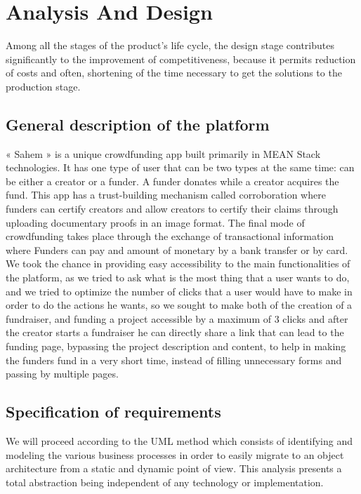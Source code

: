 

\setcounter{mtc}{10}
\chapter{Analysis And Design}%
\label{chap:chapter_two}
\minitoc
Among all the stages of the product's life cycle, the design stage contributes significantly to the improvement of competitiveness, because it permits reduction of costs and often, shortening of the time necessary to get the solutions to the production stage.

\section{General description of the platform}
« Sahem » is a unique crowdfunding app built primarily in MEAN Stack technologies. It has one type of user that can be two types at the same time: can be either a creator or a funder. A funder donates while a creator acquires the fund. This app has a trust-building mechanism called corroboration where funders can certify creators and allow creators to certify their claims through uploading documentary proofs in an image format. The final mode of crowdfunding takes place through the exchange of transactional information where Funders can pay and amount of monetary by a bank transfer or by card.
We took the chance in providing easy accessibility to the main functionalities of the platform, as we tried to ask what is the most thing that a user wants to do, and we tried to optimize the number of clicks that a user would have to make in order to do the actions he wants, so we sought to make both of the creation of a fundraiser, and funding a project accessible by a maximum of 3 clicks and after the creator starts a fundraiser he can directly share a link that can lead to the funding page, bypassing the project description and content, to help in making the funders fund in a very short time, instead of filling unnecessary forms and passing by multiple pages.

\section{Specification of requirements}
We will proceed according to the UML method which consists of identifying and modeling the various business processes in order to easily migrate to an object architecture from a static and dynamic point of view. This analysis presents a total abstraction being independent of any technology or implementation.

